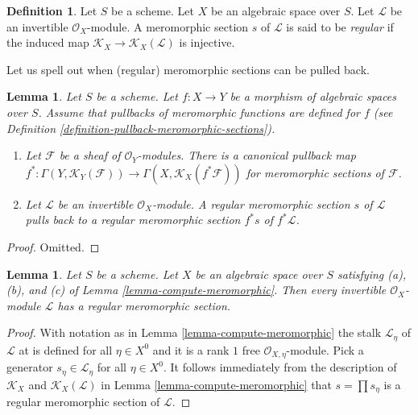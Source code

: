\documentclass{stacks-project}
\theoremstyle{plain}
\newtheorem{lemma}[subsection]{Lemma}
\theoremstyle{definition}
\newtheorem{definition}[subsection]{Definition}
\theoremstyle{remark}
\numberwithin{equation}{subsection}
\begin{document}
\begin{definition}
\label{definition-regular-meromorphic-section}
Let $S$ be a scheme.
Let $X$ be an algebraic space over $S$.
Let $\mathcal{L}$ be an invertible $\mathcal{O}_X$-module.
A meromorphic section $s$ of $\mathcal{L}$ is said to be {\it regular}
if the induced map $\mathcal{K}_X \to \mathcal{K}_X(\mathcal{L})$
is injective.
\end{definition}

\noindent
Let us spell out when (regular) meromorphic sections can be pulled back.

\begin{lemma}
\label{lemma-meromorphic-sections-pullback}
Let $S$ be a scheme.
Let $f : X \to Y$ be a morphism of algebraic spaces over $S$.
Assume that pullbacks of meromorphic functions are defined
for $f$ (see
Definition \ref{definition-pullback-meromorphic-sections}).
\begin{enumerate}
\item Let $\mathcal{F}$ be a sheaf of $\mathcal{O}_Y$-modules.
There is a canonical pullback map
$f^* : \Gamma(Y, \mathcal{K}_Y(\mathcal{F})) \to
\Gamma(X, \mathcal{K}_X(f^*\mathcal{F}))$
for meromorphic sections of $\mathcal{F}$.
\item Let $\mathcal{L}$ be an invertible $\mathcal{O}_X$-module.
A regular meromorphic section $s$ of $\mathcal{L}$ pulls back
to a regular meromorphic section $f^*s$ of $f^*\mathcal{L}$.
\end{enumerate}
\end{lemma}

\begin{proof}
Omitted.
\end{proof}

\begin{lemma}
\label{lemma-regular-meromorphic-section-exists}
Let $S$ be a scheme. Let $X$ be an algebraic space over $S$
satisfying (a), (b), and (c) of
Lemma \ref{lemma-compute-meromorphic}.
Then every invertible $\mathcal{O}_X$-module $\mathcal{L}$ has
a regular meromorphic section.
\end{lemma}

\begin{proof}
With notation as in Lemma \ref{lemma-compute-meromorphic}
the stalk $\mathcal{L}_\eta$ of $\mathcal{L}$ at is defined for all
$\eta \in X^0$ and it is a rank $1$ free $\mathcal{O}_{X, \eta}$-module.
Pick a generator $s_\eta \in \mathcal{L}_\eta$ for all $\eta \in X^0$.
It follows immediately from the description of
$\mathcal{K}_X$ and $\mathcal{K}_X(\mathcal{L})$
in Lemma \ref{lemma-compute-meromorphic}
that $s = \prod s_\eta$ is a regular meromorphic section of $\mathcal{L}$.
\end{proof}
\end{document}
